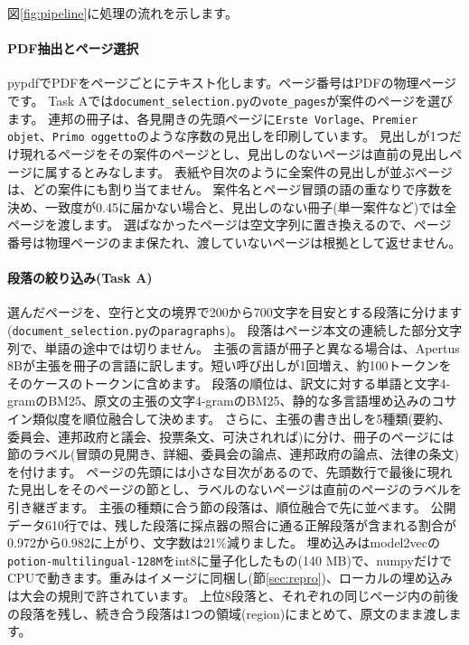 \documentclass[10pt,a4paper]{ltjsarticle}
\begin{document}
図\ref{fig:pipeline}に処理の流れを示します。

\paragraph{PDF抽出とページ選択}
pypdf\cite{pypdf}でPDFをページごとにテキスト化します。ページ番号はPDFの物理ページです。
Task Aでは\texttt{document\_selection.py}の\texttt{vote\_pages}が案件のページを選びます。
連邦の冊子は、各見開きの先頭ページに\texttt{Erste Vorlage}、\texttt{Premier objet}、\texttt{Primo oggetto}のような序数の見出しを印刷しています。
見出しが1つだけ現れるページをその案件のページとし、見出しのないページは直前の見出しページに属するとみなします。
表紙や目次のように全案件の見出しが並ぶページは、どの案件にも割り当てません。
案件名とページ冒頭の語の重なりで序数を決め、一致度が0.45に届かない場合と、見出しのない冊子(単一案件など)では全ページを渡します。
選ばなかったページは空文字列に置き換えるので、ページ番号は物理ページのまま保たれ、渡していないページは根拠として返せません。

\paragraph{段落の絞り込み(Task A)}
選んだページを、空行と文の境界で200から700文字を目安とする段落に分けます(\texttt{document\_selection.py}の\texttt{paragraphs})。
段落はページ本文の連続した部分文字列で、単語の途中では切りません。
主張の言語が冊子と異なる場合は、Apertus 8B\cite{apertus8b}が主張を冊子の言語に訳します。短い呼び出しが1回増え、約100トークンをそのケースのトークンに含めます。
段落の順位は、訳文に対する単語と文字4-gramのBM25\cite{robertson2009bm25}、原文の主張の文字4-gramのBM25、静的な多言語埋め込みのコサイン類似度を順位融合して決めます。
さらに、主張の書き出しを5種類(要約、委員会、連邦政府と議会、投票条文、可決されれば)に分け、冊子のページには節のラベル(冒頭の見開き、詳細、委員会の論点、連邦政府の論点、法律の条文)を付けます。
ページの先頭には小さな目次があるので、先頭数行で最後に現れた見出しをそのページの節とし、ラベルのないページは直前のページのラベルを引き継ぎます。
主張の種類に合う節の段落は、順位融合で先に並べます。
公開データ610行では、残した段落に採点器の照合に通る正解段落が含まれる割合が0.972から0.982に上がり、文字数は21\%減りました。
埋め込みはmodel2vecの\texttt{potion-multilingual-128M}をint8に量子化したもの(140 MB)で、numpyだけでCPUで動きます。重みはイメージに同梱し(節\ref{sec:repro})、ローカルの埋め込みは大会の規則で許されています。
上位8段落と、それぞれの同じページ内の前後の段落を残し、続き合う段落は1つの領域(region)にまとめて、原文のまま渡します。
\end{document}
